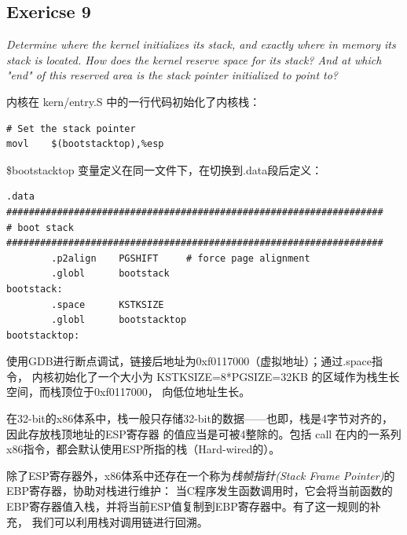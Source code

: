 \documentclass[12pt, letterpaper]{report}
\begin{document}
\subsection{\large Exericse 9}
\textsl{Determine where the kernel initializes its stack, 
        and exactly where in memory its stack is located. 
        How does the kernel reserve space for its stack? 
        And at which "end" of this reserved area 
        is the stack pointer initialized to point to?} \par
\quad \par 
内核在 kern/entry.S 中的一行代码初始化了内核栈：
\lstset{style=AssemblyStyle}
\setmainfont{Consolas}
\begin{lstlisting}
# Set the stack pointer
movl	$(bootstacktop),%esp
\end{lstlisting}
\setmainfont{Times New Roman}
\$bootstacktop 变量定义在同一文件下，在切换到.data段后定义：
\lstset{style=AssemblyStyle}
\setmainfont{Consolas}
\begin{lstlisting}
.data
###################################################################
# boot stack
###################################################################
        .p2align	PGSHIFT		# force page alignment
        .globl		bootstack
bootstack:
        .space		KSTKSIZE
        .globl		bootstacktop   
bootstacktop:

\end{lstlisting}
\setmainfont{Times New Roman}
使用GDB进行断点调试，链接后地址为0xf0117000（虚拟地址）；通过.space指令，
内核初始化了一个大小为 KSTKSIZE=8*PGSIZE=32KB 的区域作为栈生长空间，而栈顶位于0xf0117000，
向低位地址生长。
\quad \par 

在32-bit的x86体系中，栈一般只存储32-bit的数据——也即，栈是4字节对齐的，因此存放栈顶地址的ESP寄存器
的值应当是可被4整除的。包括 call 在内的一系列x86指令，都会默认使用ESP所指的栈（Hard-wired的）。\par 
除了ESP寄存器外，x86体系中还存在一个称为\textsl{栈帧指针(Stack Frame Pointer)}的EBP寄存器，协助对栈进行维护：
当C程序发生函数调用时，它会将当前函数的EBP寄存器值入栈，并将当前ESP值复制到EBP寄存器中。有了这一规则的补充，
我们可以利用栈对调用链进行回溯。\par 
\end{document}
